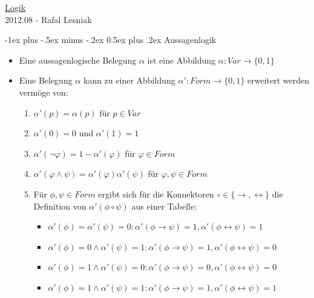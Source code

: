 \documentclass[8pt,landscape]{article}
\makeatletter
\renewcommand{\section}{\@startsection{section}{1}{0mm}%
                                {-1ex plus -.5ex minus -.2ex}%
                                {0.5ex plus .2ex}%
                                {\normalfont\large\bfseries}}
\makeatother
\begin{document}
\raggedright
\footnotesize
\begin{multicols}{3}

\setlength{\premulticols}{1pt}
\setlength{\postmulticols}{1pt}
\setlength{\multicolsep}{1pt}
\setlength{\columnsep}{2pt}

\begin{center}
  \underline{Logik}\\
  \small{2012.08 - Rafal Lesniak} \\
\end{center}


\section{Aussagenlogik}
\begin{itemize}
\item Eine aussagenlogische Belegung $ \alpha $ ist eine Abbildung $ \alpha : Var \rightarrow \{0,1\} $
\item Eine  Belegung $ \alpha $ kann zu einer Abbildung $ \alpha' : Form \rightarrow \{0,1\} $ erweitert werden verm\"oge von:
  \begin{enumerate}
  \item $ \alpha'(p) = \alpha(p) $ f\"ur $ p \in Var $
  \item $ \alpha'(0) = 0 $ und $ \alpha'(1) = 1 $
  \item $ \alpha'(\neg \varphi ) = 1 - \alpha'(\varphi) $ f\"ur $ \varphi \in Form $
  \item $ \alpha'(\varphi \wedge \psi) = \alpha'(\varphi)\alpha'(\psi) $ f\"ur $ \varphi, \psi \in Form $
  \item F\"ur $ \phi, \psi \in Form $ ergibt sich f\"ur die Konnektoren $ \circ \in \{ \rightarrow, \leftrightarrow\} $ die Definition von $ \alpha'(\phi \circ \psi) $ aus einer Tabelle:
    \begin{itemize}
    \item $ \alpha'(\phi) = \alpha'(\psi) = 0 : \alpha'(\phi \rightarrow \psi) = 1, \alpha'(\phi \leftrightarrow \psi) = 1 $
    \item $ \alpha'(\phi) = 0 \wedge \alpha'(\psi) = 1 : \alpha'(\phi \rightarrow \psi) = 1, \alpha'(\phi \leftrightarrow \psi) = 0 $
    \item $ \alpha'(\phi) = 1 \wedge \alpha'(\psi) = 0 : \alpha'(\phi \rightarrow \psi) = 0, \alpha'(\phi \leftrightarrow \psi) = 0 $
    \item $ \alpha'(\phi) = 1 \wedge \alpha'(\psi) = 1 : \alpha'(\phi \rightarrow \psi) = 1, \alpha'(\phi \leftrightarrow \psi) = 1 $
    \end{itemize}
  \end{enumerate}


\end{itemize}
\end{multicols}
\end{document}
